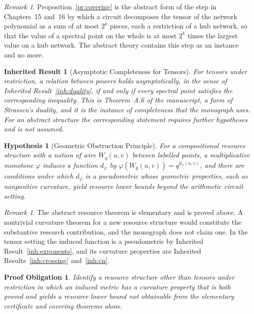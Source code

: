 \documentclass[11pt,letterpaper]{report}
\theoremstyle{plain}
\newtheorem{inherited}[theorem]{Inherited Result}
\newtheorem{hypothesis}[theorem]{Hypothesis}
\newtheorem{obligation}[theorem]{Proof Obligation}
\theoremstyle{definition}
\theoremstyle{remark}
\newtheorem{remark}[theorem]{Remark}
\begin{document}
\begin{remark}
Proposition~\ref{pr:covering} is the abstract form of the step in Chapters~15 and~16 by which a circuit decomposes the tensor of the network polynomial as a sum of at most $2^k$ pieces, each a restriction of a hub network, so that the value of a spectral point on the whole is at most $2^k$ times the largest value on a hub network. The abstract theory contains this step as an instance and no more.
\end{remark}

\begin{inherited}[Asymptotic Completeness for Tensors]\label{inh:asympcomplete}
For tensors under restriction, a relation between powers holds asymptotically, in the sense of Inherited Result~\ref{inh:duality}, if and only if every spectral point satisfies the corresponding inequality. This is Theorem~A.6 of the manuscript, a form of Strassen's duality, and it is the instance of completeness that the monograph uses. For an abstract structure the corresponding statement requires further hypotheses and is not assumed.
\end{inherited}

\begin{hypothesis}[Geometric Obstruction Principle]\label{hy:geometric}
For a compositional resource structure with a notion of wire $W_q(u,v)$ between labelled points, a multiplicative monotone $\varphi$ induces a function $d_\varphi$ by $\varphi(W_q(u,v))=q^{d_\varphi(u,v)}$, and there are conditions under which $d_\varphi$ is a pseudometric whose geometric properties, such as nonpositive curvature, yield resource lower bounds beyond the arithmetic circuit setting.
\end{hypothesis}

\begin{remark}
The abstract resource theorem is elementary and is proved above. A nontrivial curvature theorem for a new resource structure would constitute the substantive research contribution, and the monograph does not claim one. In the tensor setting the induced function is a pseudometric by Inherited Result~\ref{inh:exponents}, and its curvature properties are Inherited Results~\ref{inh:crossing} and~\ref{inh:cn}.
\end{remark}

\begin{obligation}\label{ob:generaltheory}
Identify a resource structure other than tensors under restriction in which an induced metric has a curvature property that is both proved and yields a resource lower bound not obtainable from the elementary certificate and covering theorems alone.
\end{obligation}
\end{document}
